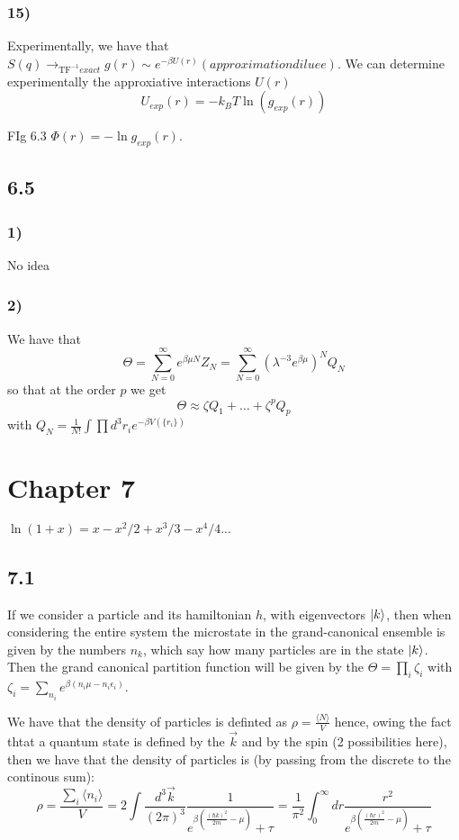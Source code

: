 \documentclass[10pt,a4paper]{book}
\newcommand{\tf}{\text{TF}}
\begin{document}
\subsection*{15)}

Experimentally, we have that $S(q)\to_{\tf^{-1}exact }g(r)\sim e^{-\beta U(r)}(approximation diluee)$. We can determine experimentally the approxiative interactions $U(r)$
$$U_{exp}(r)=-k_BT\ln(g_{exp}(r))$$

FIg 6.3 $\Phi(r)=-\ln g_{exp}(r)$. 


\section*{6.5}

\subsection*{1)}
No idea

\subsection*{2)}

We have that
$$\Theta=\sum_{N=0}^{\infty}e^{\beta \mu N}Z_N=\sum_{N=0}^{\infty}(\lambda^{-3}e^{\beta\mu})^NQ_N$$
so that at the order $p$ we get
$$\Theta\approx \zeta Q_1+\ldots+\zeta^{p}Q_p$$
with $Q_N=\frac{1}{N!}\int\prod d^3{r}_i e^{-\beta V(\{r_i\})}$


\chapter*{Chapter 7}
$\ln(1+x)=x-x^2/2+x^3/3-x^4/4...$
\section*{7.1}
If we consider a particle and its hamiltonian $h$, with eigenvectors $\ket{k}$, then when considering the entire system the microstate in the grand-canonical ensemble is given by the numbers $n_k$, which say how many particles are in the state $\ket{k}$. Then the grand canonical partition function will be given by the $\Theta=\prod_i\zeta_i$ with $\zeta_i=\sum_{n_i} e^{\beta(n_i\mu-n_i\epsilon_i)}$.



We have that the density of particles is definted as $\rho=\frac{\langle N\rangle}{V}$
hence, owing the fact thtat a quantum state is defined by the $\vec{k}$ and by the spin (2 possibilities here), then we have that the density of particles is (by passing from the discrete to the continous sum):
$$\rho=\frac{\sum_i\langle n_i\rangle}{V}=2\int\frac{d^3\vec{k}}{(2\pi)^3}\frac{1}{e^{\beta(\frac{(\hbar k)^2}{2m}-\mu)}+\tau}=\frac{1}{\pi^2}\int_0^{\infty} dr\frac{r^2}{e^{\beta(\frac{(\hbar r)^2}{2m}-\mu)}+\tau}$$
\end{document}

